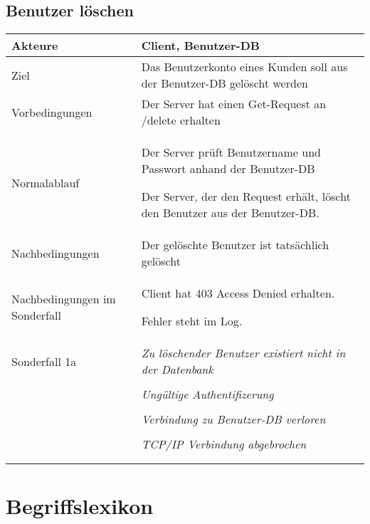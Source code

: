\documentclass[a4paper,10pt,titlepage]{article}
\makeatletter
\newcommand\novspace{\@minipagetrue}
\newenvironment{owncompactitem}{%
\compactitem
}{%
\@finalstrut\@arstrutbox
\@nameuse{endcompactitem}%
\aftergroup\let\aftergroup\@finalstrut\aftergroup\@gobble
}
\newenvironment{owncompactenum}{%
\compactenum
}{%
\@finalstrut\@arstrutbox
\@nameuse{endcompactenum}%
\aftergroup\let\aftergroup\@finalstrut\aftergroup\@gobble
}
\newcommand{\usecase}[7]
{\subsection{#1}
\setlength{\extrarowheight}{2pt}
\begin{tabular}{|p{0.2\textwidth}|p{0.9\textwidth}|}
\hline
  Akteure & #2\\\hline
  Ziel & #3\\\hline
  Vorbedingungen & \novspace
  	\begin{owncompactitem}[-] #4 \end{owncompactitem} \\\hline
  Normalablauf & \vspace{-7pt}
  	\begin{owncompactenum}[1.] #6 \end{owncompactenum} \\\hline
  Nachbedingungen & \novspace
  	\begin{owncompactitem}[-] #5 \end{owncompactitem} \\\hline
  #7
\end{tabular}
}
\newcommand{\sonderfall}[4][\empty]
{
Sonderfall #2 & \vspace{-10pt}
	\textit{#3}
	\begin{owncompactenum}[{#2}.1] {#4} \end{owncompactenum}
  	\ifthenelse{\equal{#1}{\empty}}
    	{\\\hline} %
    	{\ensuremath{\rightarrow} #1 \\ [+1pt] \hline} %

}
\newcommand{\sondernachbedingung}[1]
{
Nachbedingungen im Sonderfall& \novspace
	\begin{owncompactitem}[-]
		#1
	\end{owncompactitem} \\\hline
}
\makeatother
\begin{document}
\usecase{Benutzer löschen}{Client, Benutzer-DB}%
{Das Benutzerkonto eines Kunden soll aus der Benutzer-DB gelöscht werden}%
{%
  \item Der Server hat einen Get-Request an /delete erhalten
}
{%
  \item Der gelöschte Benutzer ist tatsächlich gelöscht
}
{%
  \item Der Server prüft Benutzername und Passwort anhand der Benutzer-DB
  \item Der Server, der den Request erhält, löscht den Benutzer aus der Benutzer-DB.
}
{%
  \sondernachbedingung{
	\item Client hat 403 Access Denied erhalten.
	\item Fehler steht im Log.
	}
  \sonderfall[Weiter mit normalem Betrieb]{1a}%
	  {Zu löschender Benutzer existiert nicht in der Datenbank}%
	  {
	  \item Der Server schickt eine entsprechende Fehlermeldung an den Client, der die Lösch-Anfrage verursacht hat
	  }
	  		\sonderfall[Weiter mit normalem Betrieb]{1a}
    {Ungültige Authentifizerung}
    {
    \item Fehler wird ins Log geschrieben
  	\item Der Client erhält eine entsprechende Fehlermeldung mit HTTP-Status 403 Access Denied
    }
	\sonderfall[Kritischer Fehler, Server ist beendet]{*}%
	{Verbindung zu Benutzer-DB verloren}%
  	{
	\item Der Fehler wird ins Log geschrieben (als schwerwiegender Fehler)
	\item Der Client erhält eine entsprechende Fehlermeldung
	\item Der Server wird beendet
  	}

\sonderfall[Weiter mit normalem Betrieb]{**}%
	{TCP/IP Verbindung abgebrochen}%
	{
	\item Fehlermeldung wird ins Log geschrieben
	}
}
\clearpage
\appendix
\section{Begriffslexikon}
\end{document}
